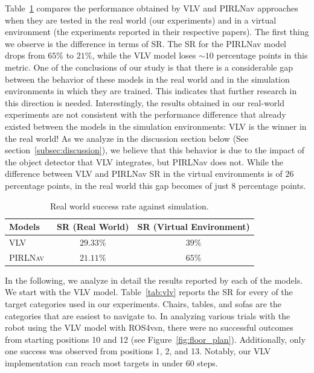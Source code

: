 Table~\ref{tab:results_sota} compares the performance obtained by VLV and PIRLNav approaches when they are tested in the real world (\ie our experiments) and in a virtual environment (\ie the experiments reported in their respective papers).
The first thing we observe is the difference in terms of SR\@.
The SR for the PIRLNav model drops from $65\%$ to $21\%$, while the VLV model loses $\sim10$ percentage points in this metric.
One of the conclusions of our study is that there is a considerable gap between the behavior of these models in the real world and in the simulation environments in which they are trained.
This indicates that further research in this direction is needed.
Interestingly, the results obtained in our real-world experiments are not consistent with the performance difference that already existed between the models in the simulation environments: VLV is the winner in the real world!
As we analyze in the discussion section below (See section~\ref{subsec:discussion}), we believe that this behavior is due to the impact of the object detector that VLV integrates, but PIRLNav does not.
While the difference between VLV and PIRLNav SR in the virtual environments is of $26$ percentage points, in the real world this gap becomes of just $8$ percentage points.

\begin{table}
    \centering
    \begin{tabular}{l|cc}
        \toprule
        \textbf{Models} & SR (Real World) & SR (Virtual Environment) \\
        \midrule
        \textsc{VLV}~\cite{chang2020} & $29.33\%$ & $39\%$ \\
        \textsc{PIRLNav}~\cite{ramrakhya2023} & $21.11\%$ & $65\%$ \\
        \bottomrule
    \end{tabular}
    \caption{Real world success rate against simulation.}
    \label{tab:results_sota}
\end{table}

In the following, we analyze in detail the results reported by each of the models.
We start with the VLV model.
Table~\ref{tab:vlv} reports the SR for every of the target categories used in our experiments.
Chairs, tables, and sofas are the categories that are easiest to navigate to.
In analyzing various trials with the robot using the VLV model with ROS4\acrshort{vsn}, there were no successful outcomes from starting positions 10 and 12 (see Figure~\ref{fig:floor_plan}).
Additionally, only one success was observed from positions 1, 2, and 13.
Notably, our VLV implementation can reach most targets in under 60 steps.


